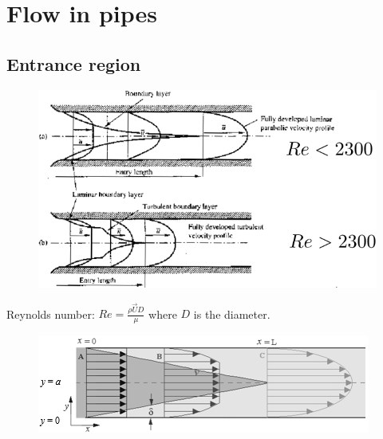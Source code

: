 \documentclass[class=report, crop=false, 12pt,a4paper]{standalone}
\begin{document}
\section{Flow in pipes}
\subsection{Entrance region}
\begin{figure}[H]
  \centering
  \includegraphics[width = 0.9 \textwidth]{../img/diagram79.png}
  \caption{}
\end{figure}
Reynolds number: $Re = \frac{\rho \vec{U} D}{\mu}$ where $D$ is the diameter.
\begin{figure}[H]
  \centering
  \includegraphics[width = 0.6 \textwidth]{../img/diagram80.png}
  \caption{}
\end{figure}
\end{document}
